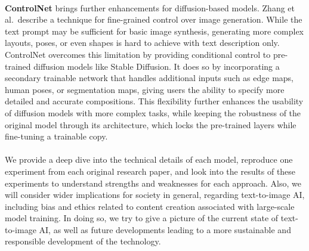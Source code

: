 \\
\textbf{ControlNet} brings further enhancements for diffusion-based models. Zhang et al.\ describe a technique for fine-grained control over image generation. While the text prompt may be sufficient for basic image synthesis, generating more complex layouts, poses, or even shapes is hard to achieve with text description only. ControlNet overcomes this limitation by providing conditional control to pre-trained diffusion models like Stable Diffusion. It does so by incorporating a secondary trainable network that handles additional inputs such as edge maps, human poses, or segmentation maps, giving users the ability to specify more detailed and accurate compositions. This flexibility further enhances the usability of diffusion models with more complex tasks, while keeping the robustness of the original model through its architecture, which locks the pre-trained layers while fine-tuning a trainable copy.
\\
\\
We provide a deep dive into the technical details of each model, reproduce one experiment from each original research paper, and look into the results of these experiments to understand strengths and weaknesses for each approach. Also, we will consider wider implications for society in general, regarding text-to-image AI, including bias and ethics related to content creation associated with large-scale model training. In doing so, we try to give a picture of the current state of text-to-image AI, as well as future developments leading to a more sustainable and responsible development of the technology.